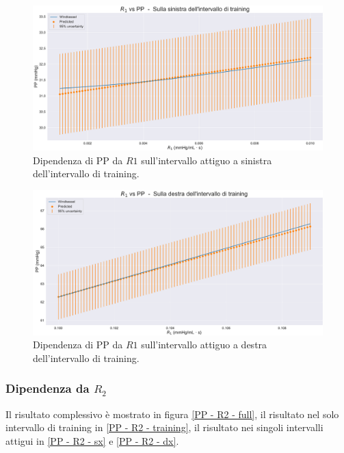 \begin{figure}
    \centering
    \includegraphics[width=1\textwidth]{images/Training (risultati)/PP/PP - R1 - sx.pdf}
    \caption{Dipendenza di PP da $R1$ sull'intervallo attiguo a sinistra dell'intervallo di training.}
    \label{PP - R1 - sx}
\end{figure}



\begin{figure}
    \centering
    \includegraphics[width=1\textwidth]{images/Training (risultati)/PP/PP - R1 - dx.pdf}
    \caption{Dipendenza di PP da $R1$ sull'intervallo attiguo a destra dell'intervallo di training.}
    \label{PP - R1 - dx}
\end{figure}

\newpage


\subsubsection{Dipendenza da $R_2$}
Il risultato complessivo è mostrato in figura \ref{PP - R2 - full}, il risultato nel solo intervallo di training in \ref{PP - R2 - training}, il risultato nei singoli intervalli attigui in \ref{PP - R2 - sx} e \ref{PP - R2 - dx}.

